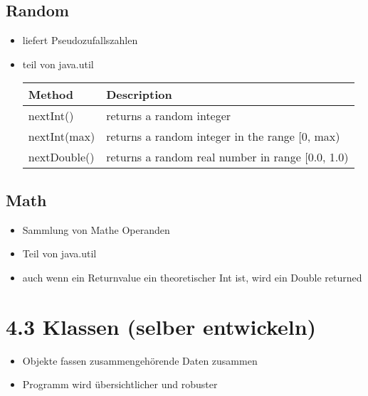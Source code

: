 \documentclass[11pt]{article}
\begin{document}
\subsection{Random}
\label{sec:orgfd5e942}
\begin{itemize}
\item liefert Pseudozufallszahlen\\
\item teil von java.util\\
\begin{center}
\begin{tabular}{ll}
Method & Description\\
\hline
nextInt() & returns a random integer\\
nextInt(max) & returns a random integer in the range [0, max)\\
nextDouble() & returns a random real number in range [0.0, 1.0)\\
\end{tabular}
\end{center}
\end{itemize}

\subsection{Math}
\label{sec:orgaa74cab}
\begin{itemize}
\item Sammlung von Mathe Operanden\\
\item Teil von java.util\\
\item auch wenn ein Returnvalue ein theoretischer Int ist, wird ein Double returned\\
\end{itemize}

\section{4.3 Klassen (selber entwickeln)}
\label{sec:org42494f2}
\begin{itemize}
\item Objekte fassen zusammengehörende Daten zusammen\\
\item Programm wird übersichtlicher und robuster\\
\end{itemize}
\end{document}
